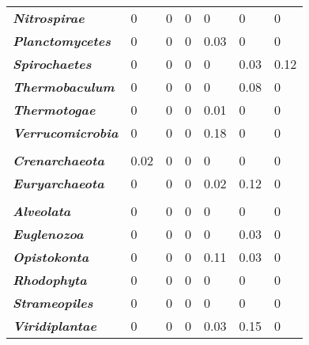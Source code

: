 \begin{table}
\begin{tabularx}{\textwidth}{p{3.5cm}p{0.8cm}p{0.8cm}p{0.8cm}XXX}
\textbf{\emph{Nitrospirae}} & 0 & 0 & 0 & 0 & 0 & 0 \\
\textbf{\emph{Planctomycetes}} & 0 & 0 & 0 & 0.03 & 0 & 0 \\
\textbf{\emph{Spirochaetes}} & 0 & 0 & 0 & 0 & 0.03 & 0.12 \\
\textbf{\emph{Thermobaculum}} & 0 & 0 & 0 & 0 & 0.08 & 0 \\
\textbf{\emph{Thermotogae}} & 0 & 0 & 0 & 0.01 & 0 & 0 \\
\textbf{\emph{Verrucomicrobia}} & 0 & 0 & 0 & 0.18 & 0 & 0 \\
 &  &  &  &  &  &  \\
\textbf{\emph{Crenarchaeota}} & 0.02 & 0 & 0 & 0 & 0 & 0 \\
\textbf{\emph{Euryarchaeota}} & 0 & 0 & 0 & 0.02 & 0.12 & 0 \\
 &  &  &  &  &  &  \\
\textbf{\emph{Alveolata}} & 0 & 0 & 0 & 0 & 0 & 0 \\
\textbf{\emph{Euglenozoa}} & 0 & 0 & 0 & 0 & 0.03 & 0 \\
\textbf{\emph{Opistokonta}} & 0 & 0 & 0 & 0.11 & 0.03 & 0 \\
\textbf{\emph{Rhodophyta}} & 0 & 0 & 0 & 0 & 0 & 0 \\
\textbf{\emph{Strameopiles}} & 0 & 0 & 0 & 0 & 0 & 0 \\
\textbf{\emph{Viridiplantae}} & 0 & 0 & 0 & 0.03 & 0.15 & 0 \\
\bottomrule
\end{tabularx}
\end{table}

